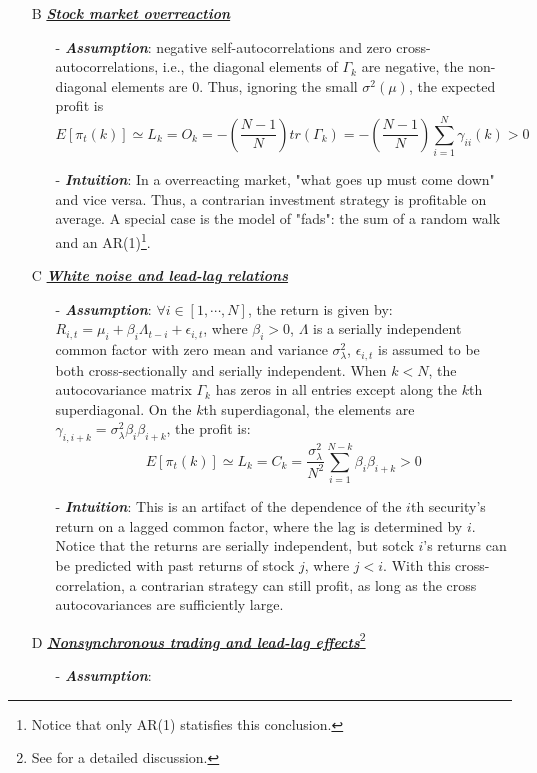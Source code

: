 \begin{enumerate}
    \item[B] \underline{\textbf{\textit{Stock market overreaction}}}
    \begin{enumerate}
        \item[-] \textbf{\textit{Assumption}}: negative self-autocorrelations and zero cross-autocorrelations, i.e., 
        the diagonal elements of $\Gamma_k$ are negative, the non-diagonal elements are 0. Thus, ignoring the small $\sigma^2(\mu)$, 
        the expected profit is $$E[\pi_t(k)]\simeq L_k = O_k = -\left(\frac{N-1}{N}\right)tr(\Gamma_k) = -\left(\frac{N-1}{N}\right)\sum^N_{i=1}\gamma_{ii}(k)>0$$ 
        \item[-] \textit{\textbf{Intuition}}: In a overreacting market, "what goes up must come down" and vice versa. Thus, a contrarian investment strategy is profitable on average.
        A special case is the model of "fads": the sum of a random walk and an AR(1)\footnote{Notice that only AR(1) statisfies this conclusion.}.
    \end{enumerate}
    \item[C] \underline{\textbf{\textit{White noise and lead-lag relations}}}
    \begin{enumerate}
        \item[-] \textbf{\textit{Assumption}}: $\forall i \in [1,\cdots,N]$, the return is given by: $R_{i,t}=\mu_i+\beta_i\Lambda_{t-i}+\epsilon_{i,t}$, where $\beta_i>0$,
        $\Lambda$ is a serially independent common factor with zero mean and variance $\sigma_{\lambda}^2$, $\epsilon_{i,t}$ is assumed to be both cross-sectionally and serially independent.
        When $k<N$, the autocovariance matrix $\Gamma_k$ has zeros in all entries except along the $k$th superdiagonal. On the $k$th superdiagonal, 
        the elements are $\gamma_{i,i+k}=\sigma^2_{\lambda}\beta_i\beta_{i+k}$, the profit is: $$E[\pi_t(k)]\simeq L_k = C_k = \frac{\sigma^2_{\lambda}}{N^2}\sum^{N-k}_{i=1}\beta_i\beta_{i+k}>0$$
        \item[-] \textbf{\textit{Intuition}}: This is an artifact of the dependence of the $i$th security's return on a lagged common factor, where the lag is determined by $i$. Notice that the returns
        are serially independent, but sotck $i$'s returns can be predicted with past returns of stock $j$, where $j<i$. With this cross-correlation, a contrarian strategy can still profit, as long
        as the cross autocovariances are sufficiently large.
    \end{enumerate} 
    \item[D] \underline{\textbf{\textit{Nonsynchronous trading and lead-lag effects}}}\footnote{See \citet{lo1990econometric} for a detailed discussion.}
    \begin{enumerate}
        \item[-] \textbf{\textit{Assumption}}:
        

\end{enumerate}
\end{enumerate}
